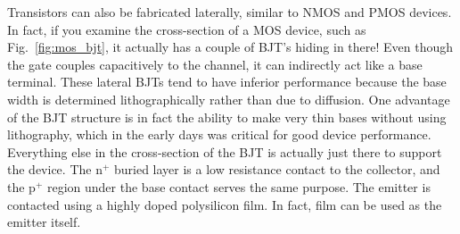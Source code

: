 Transistors can also be fabricated laterally, similar to NMOS and PMOS devices.  In fact, if you examine the cross-section of a MOS device, such as Fig.~\ref{fig:mos_bjt}, it actually has a couple of BJT's hiding in there!  Even though the gate couples capacitively to the channel, it can indirectly act like a base terminal.  These lateral BJTs tend to have inferior performance because the base width is determined lithographically rather than due to diffusion. One advantage of the BJT structure is in fact the ability to make very thin bases without using lithography, which in the early days was critical for good device performance.
Everything else in the cross-section of the BJT is actually just there to support the device.  The n$^+$ buried layer is a low resistance contact to the collector, and the p$^+$ region under the base contact serves the same purpose.  The emitter is contacted using a highly doped polysilicon film. In fact, film can be used as the emitter itself.
